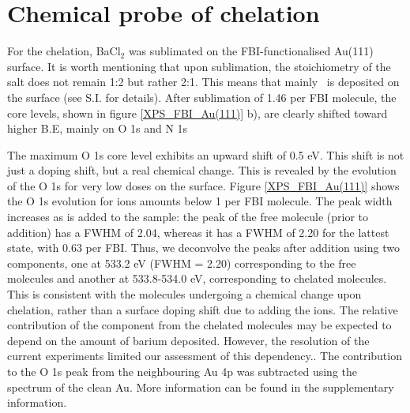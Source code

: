 \documentclass[aps,prl,reprint,longbibliography,superscriptaddress, english]{revtex4-1}
\def\BappCl{BaCl$_2$ }
\newcommand{\completar}[1]{{\color{red} #1}}
\begin{document}
\section{Chemical probe of chelation}
For the chelation, \BappCl was sublimated on the FBI-functionalised Au(111) surface. It is worth mentioning that upon sublimation, the stoichiometry of the salt does not remain 1:2 but rather 2:1. This means that mainly \Bapp\ is deposited on the surface (see S.I. for details).
After sublimation of 1.46 \Bapp per FBI molecule, the core levels, shown in figure \ref{XPS_FBI_Au(111)} b), are clearly shifted toward higher B.E, mainly on O 1s and N 1s

The maximum O 1s core level exhibits an upward shift of 0.5 eV. This shift is not just a doping shift, but a real chemical change. This is revealed by the evolution of the O 1s for very low \Bapp doses on the surface. Figure \ref{XPS_FBI_Au(111)} shows the O 1s evolution for \Bapp ions amounts below 1 \Bapp per FBI molecule. The peak width increases as \Bapp is added to the sample: the peak of the free molecule (prior to \Bapp addition) has a FWHM of 2.04, whereas it has a FWHM of 2.20 for the lattest state, with 0.63 \Bapp per FBI. Thus, we deconvolve the peaks after \Bapp addition using two components, one at 533.2 eV (FWHM = 2.20) corresponding to the free molecules and another at 533.8-534.0 eV, corresponding to chelated molecules.   This is consistent with the molecules undergoing a chemical change upon chelation, rather than a surface doping shift due to adding the ions. \completar{The relative contribution of the component from the chelated molecules may be expected to depend on the amount of barium deposited. However, the resolution of the current experiments limited our assessment of this dependency.}. The contribution to the O 1s peak from the neighbouring Au 4p was subtracted using the spectrum of the clean Au. More information can be found in the supplementary information.
\end{document}
